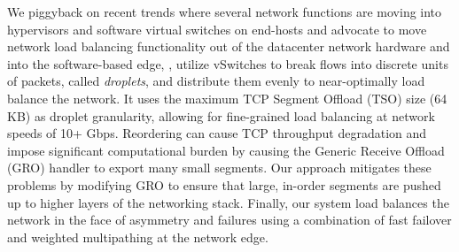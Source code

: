 %
%
%

We piggyback on recent trends where several network functions are moving into hypervisors and software virtual switches on end-hosts and advocate to move network load balancing functionality out of the datacenter network hardware and into the software-based edge, \ie{}, utilize vSwitches to break flows into discrete units of packets, called 
{\em droplets}, and distribute them evenly 
to near-optimally load balance the network. 
It uses the maximum TCP Segment Offload (TSO) size (64 KB) as droplet granularity, 
allowing for fine-grained load balancing at network speeds of 10+ Gbps.  
Reordering can cause TCP throughput degradation and impose significant computational burden by causing the Generic Receive Offload (GRO) handler to export many small segments. Our approach mitigates these problems by modifying GRO to ensure that large, in-order segments are pushed up to higher layers of the networking stack.
Finally, our system load balances the network
in the face of asymmetry and failures using a combination of fast failover and weighted multipathing at the network edge.

